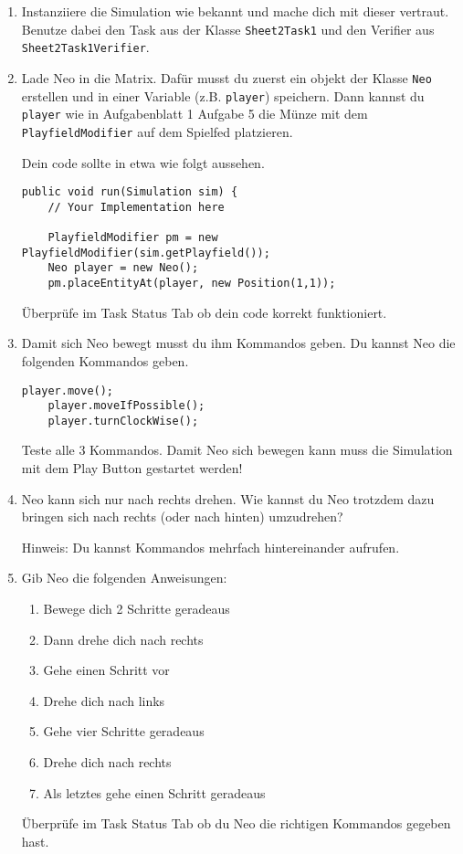 



\begin{enumerate}
    \item Instanziiere die Simulation wie bekannt und mache dich mit dieser vertraut. 
        Benutze dabei den Task aus der Klasse \lstinline{Sheet2Task1} und den Verifier aus \lstinline{Sheet2Task1Verifier}.
    \item Lade Neo in die Matrix.
        Dafür musst du zuerst ein objekt der Klasse \lstinline{Neo} erstellen und in einer Variable (z.B. \lstinline{player}) speichern.
        Dann kannst du \lstinline{player} wie in Aufgabenblatt 1 Aufgabe 5 die Münze mit dem \lstinline{PlayfieldModifier} auf dem Spielfed platzieren.

        Dein code sollte in etwa wie folgt aussehen.

        \begin{lstlisting}[firstnumber=14]
public void run(Simulation sim) {
    // Your Implementation here

    PlayfieldModifier pm = new PlayfieldModifier(sim.getPlayfield());
    Neo player = new Neo();
    pm.placeEntityAt(player, new Position(1,1));
        \end{lstlisting}

        Überprüfe im Task Status Tab ob dein code korrekt funktioniert.
    \item Damit sich Neo bewegt musst du ihm Kommandos geben.
        Du kannst Neo die folgenden Kommandos geben.

        \begin{lstlisting}[firstnumber=20]
    player.move();
    player.moveIfPossible();
    player.turnClockWise();
        \end{lstlisting}

        Teste alle 3 Kommandos.
        Damit Neo sich bewegen kann muss die Simulation mit dem Play Button gestartet werden!
    \item Neo kann sich nur nach rechts drehen.
        Wie kannst du Neo trotzdem dazu bringen sich nach rechts (oder nach hinten) umzudrehen?

        Hinweis: Du kannst Kommandos mehrfach hintereinander aufrufen.
    \item Gib Neo die folgenden Anweisungen:
        
        {
            \begin{enumerate}
                \item Bewege dich 2 Schritte geradeaus
                \item Dann drehe dich nach rechts
                \item Gehe einen Schritt vor
                \item Drehe dich nach links
                \item Gehe vier Schritte geradeaus
                \item Drehe dich nach rechts
                \item Als letztes gehe einen Schritt geradeaus
            \end{enumerate}
        }

        Überprüfe im Task Status Tab ob du Neo die richtigen Kommandos gegeben hast.
\end{enumerate}

